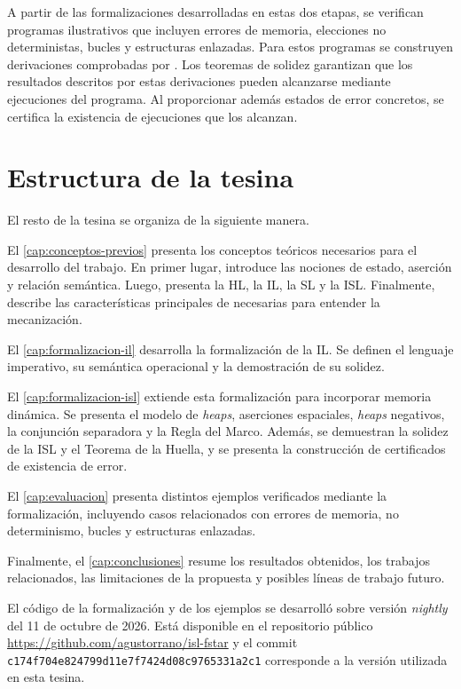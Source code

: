 \documentclass[a4paper,	11pt]{report}
\begin{document}
A partir de las formalizaciones desarrolladas en estas dos etapas,
se verifican programas ilustrativos que incluyen errores de memoria,
elecciones no deterministas, bucles y estructuras enlazadas.
Para estos programas se construyen derivaciones comprobadas por \fstar{}.
Los teoremas de solidez garantizan que los resultados descritos por estas derivaciones pueden alcanzarse
mediante ejecuciones del programa.
Al proporcionar además estados de error concretos,
se certifica la existencia de ejecuciones que los alcanzan.

\section{Estructura de la tesina}
\label{sec:estructura}
El resto de la tesina se organiza de la siguiente manera.

El \autoref{cap:conceptos-previos} presenta los conceptos teóricos necesarios para el desarrollo del trabajo.
En primer lugar, introduce las nociones de estado, aserción y relación semántica.
Luego, presenta la HL, la IL, la SL y la ISL.
Finalmente, describe las características principales de \fstar{} necesarias para entender la mecanización.

El \autoref{cap:formalizacion-il} desarrolla la formalización de la IL.
Se definen el lenguaje imperativo, su semántica operacional y la demostración de su solidez.

El \autoref{cap:formalizacion-isl} extiende esta formalización para incorporar memoria dinámica.
Se presenta el modelo de \emph{heaps}, aserciones espaciales, \emph{heaps} negativos,
la conjunción separadora y la Regla del Marco.
Además,
se demuestran la solidez de la ISL y el Teorema de la Huella,
y se presenta la construcción de certificados de existencia de error.

El \autoref{cap:evaluacion} presenta distintos ejemplos verificados mediante la formalización,
incluyendo casos relacionados con errores de memoria, no determinismo, bucles y estructuras enlazadas.

Finalmente, el \autoref{cap:conclusiones} resume los resultados obtenidos, los trabajos relacionados,
las limitaciones de la propuesta y posibles líneas de trabajo futuro.

El código de la formalización y de los ejemplos se desarrolló sobre \fstar{} versión \emph{nightly} del 11 de octubre de 2026.
Está disponible en el repositorio público
\url{https://github.com/agustorrano/isl-fstar} y el commit \lstinline|c174f704e824799d11e7f7424d08c9765331a2c1|
corresponde a la versión utilizada en esta tesina.
\end{document}
